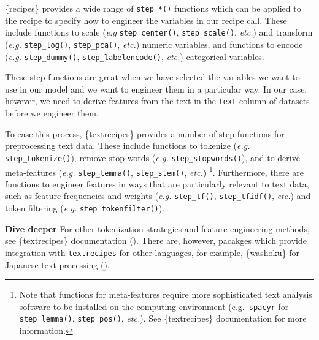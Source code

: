 \documentclass[
  letterpaper,
  krantz1]{latex/krantz-mod}
\theoremstyle{definition}
\theoremstyle{definition}
\theoremstyle{remark}
\begin{document}
\{recipes\} provides a wide range of \texttt{step\_*()} functions which
can be applied to the recipe to specify how to engineer the variables in
our recipe call. These include functions to scale (\emph{e.g}
\texttt{step\_center()}, \texttt{step\_scale()}, \emph{etc.}) and
transform (\emph{e.g.} \texttt{step\_log()}, \texttt{step\_pca()},
\emph{etc.}) numeric variables, and functions to encode (\emph{e.g.}
\texttt{step\_dummy()}, \texttt{step\_labelencode()}, \emph{etc.})
categorical variables.

These step functions are great when we have selected the variables we
want to use in our model and we want to engineer them in a particular
way. In our case, however, we need to derive features from the text in
the \texttt{text} column of datasets before we engineer them.

To ease this process, \{textrecipes\} provides a number of step
functions for preprocessing text data. These include functions to
tokenize (\emph{e.g.} \texttt{step\_tokenize()}), remove stop words
(\emph{e.g.} \texttt{step\_stopwords()}), and to derive meta-features
(\emph{e.g.} \texttt{step\_lemma()}, \texttt{step\_stem()}, \emph{etc.})
\footnote{Note that functions for meta-features require more
  sophisticated text analysis software to be installed on the computing
  environment (e.g.~\texttt{spacyr} for \texttt{step\_lemma()},
  \texttt{step\_pos()}, \emph{etc.}). See \{textrecipes\} documentation
  for more information.}. Furthermore, there are functions to engineer
features in ways that are particularly relevant to text data, such as
feature frequencies and weights (\emph{e.g.} \texttt{step\_tf()},
\texttt{step\_tfidf()}, \emph{etc.}) and token filtering (\emph{e.g.}
\texttt{step\_tokenfilter()}).

\begin{tcolorbox}[enhanced jigsaw, leftrule=.75mm, colframe=quarto-callout-color-frame, left=2mm, colback=white, toprule=.15mm, breakable, arc=.35mm, opacityback=0, bottomrule=.15mm, rightrule=.15mm]

\textbf{ Dive deeper} For other tokenization strategies
and feature engineering methods, see \{textrecipes\} documentation
(). There are, however,
pacakges which provide integration with \texttt{textrecipes} for other
languages, for example, \{washoku\} for Japanese text processing
().

\end{tcolorbox}
\end{document}

